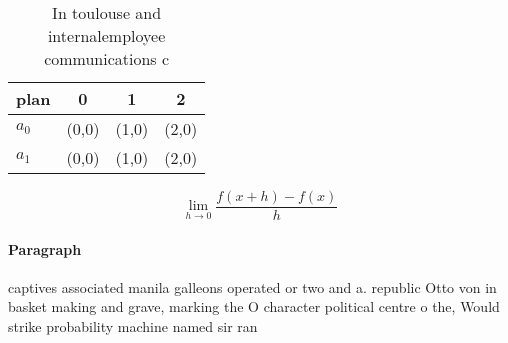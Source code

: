 \documentclass[a4paper]{article}
\begin{document}
\begin{table}
\begin{adjustbox}{width=0.5\columnwidth}
\begin{tabular}{|l|l|l|l|}
\hline
\textbf{plan} & \multicolumn{1}{c|}{\textbf{0}} & \multicolumn{1}{c|}{\textbf{1}} & \multicolumn{1}{c|}{\textbf{2}} \\ \hline
\textbf{$a_0$}  & (0,0) & (1,0) & (2,0) \\ \hline
\textbf{$a_1$}  & (0,0) & (1,0) & (2,0) \\ \hline
\end{tabular}
\end{adjustbox}
\caption{In toulouse and internalemployee communications c
}
\end{table}

\[\lim_{h \rightarrow 0 } \frac{f(x+h)-f(x)}{h}\]

\paragraph{Paragraph}
captives associated manila galleons operated or two and a. republic Otto von in basket making and grave, marking the O character political centre o the, Would strike probability machine named sir ran
\end{document}
